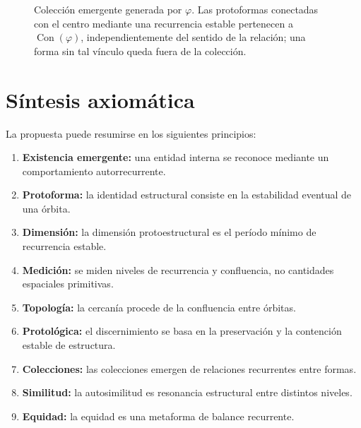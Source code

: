 \documentclass[11pt]{article}
\numberwithin{equation}{section}
\theoremstyle{prism}
\newcommand{\pentails}{\Rightarrow_{\!r}}
\DeclareMathOperator{\Con}{Con}
\begin{document}
\begin{figure}[htbp]
  \caption{Colección emergente generada por $\varphi$. Las protoformas
  conectadas con el centro mediante una recurrencia estable pertenecen a
  $\Con(\varphi)$, independientemente del sentido de la relación; una forma
  sin tal vínculo queda fuera de la colección.}
  \label{fig:coleccion-emergente}
\end{figure}

\FloatBarrier

\section{Síntesis axiomática}

La propuesta puede resumirse en los siguientes principios:
\begin{enumerate}[label=\textbf{P\arabic*.}]
  \item \textbf{Existencia emergente:} una entidad interna se reconoce mediante
  un comportamiento autorrecurrente.
  \item \textbf{Protoforma:} la identidad estructural consiste en la estabilidad
  eventual de una órbita.
  \item \textbf{Dimensión:} la dimensión protoestructural es el período mínimo de
  recurrencia estable.
  \item \textbf{Medición:} se miden niveles de recurrencia y confluencia, no
  cantidades espaciales primitivas.
  \item \textbf{Topología:} la cercanía procede de la confluencia entre órbitas.
  \item \textbf{Protológica:} el discernimiento se basa en la preservación y la
  contención estable de estructura.
  \item \textbf{Colecciones:} las colecciones emergen de relaciones recurrentes
  entre formas.
  \item \textbf{Similitud:} la autosimilitud es resonancia estructural entre
  distintos niveles.
  \item \textbf{Equidad:} la equidad es una metaforma de balance recurrente.
\end{enumerate}
\end{document}
